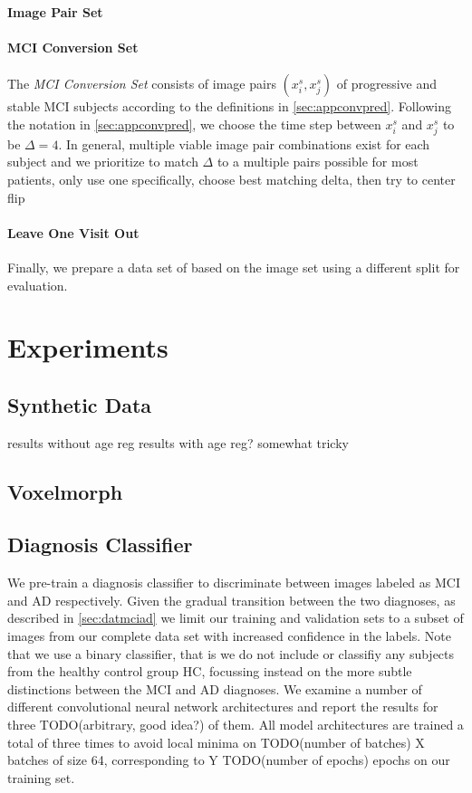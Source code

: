 \subsubsection*{Image Pair Set} \label{sec:datpairs}

\subsubsection*{MCI Conversion Set} \label{sec:datconv}
The \textit{MCI Conversion Set} consists of image pairs $(x^s_i, x^s_j)$ of progressive and stable MCI subjects according to the definitions in \autoref{sec:appconvpred}. Following the notation in \ref{sec:appconvpred}, we choose the time step between $x^s_i$ and $x^s_j$ to be $\Delta = 4$. In general, multiple viable image pair combinations exist for each subject and we prioritize to match $\Delta$ to a 
multiple pairs possible for most patients, only use one
specifically, choose best matching delta, then try to center flip

\subsubsection*{Leave One Visit Out} \label{sec:datloo}
Finally, we prepare a data set of based on the image set  using a different split for evaluation.

\chapter{Experiments}

\section{Synthetic Data}
results without age reg
results with age reg? somewhat tricky

\section{Voxelmorph}


\section{Diagnosis Classifier}
We pre-train a diagnosis classifier to discriminate between images labeled as MCI and AD respectively. Given the gradual transition between the two diagnoses, as described in \autoref{sec:datmciad} we limit our training and validation sets to a subset of images from our complete data set with increased confidence in the labels. Note that we use a binary classifier, that is we do not include or classifiy any subjects from the healthy control group HC, focussing instead on the more subtle distinctions between the MCI and AD diagnoses. We examine a number of different convolutional neural network architectures and report the results for three TODO(arbitrary, good idea?) of them. All model architectures are trained a total of three times to avoid local minima on TODO(number of batches) X batches of size 64, corresponding to Y TODO(number of epochs) epochs on our training set.

